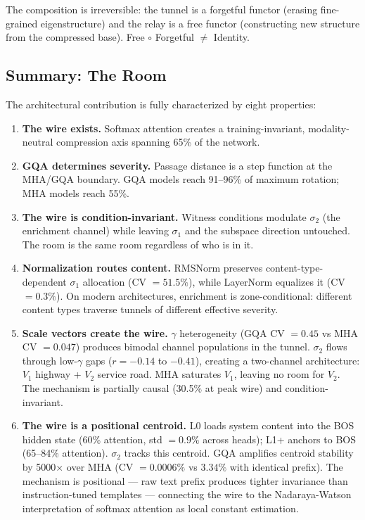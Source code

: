 \documentclass[12pt]{article}
\begin{document}
The composition is irreversible: the tunnel is a forgetful functor (erasing fine-grained eigenstructure) and the relay is a free functor (constructing new structure from the compressed base). Free $\circ$ Forgetful $\neq$ Identity.

\subsection{Summary: The Room}

The architectural contribution is fully characterized by eight properties:

\begin{enumerate}
\item \textbf{The wire exists.} Softmax attention creates a training-invariant, modality-neutral compression axis spanning 65\% of the network.
\item \textbf{GQA determines severity.} Passage distance is a step function at the MHA/GQA boundary. GQA models reach 91--96\% of maximum rotation; MHA models reach 55\%.
\item \textbf{The wire is condition-invariant.} Witness conditions modulate $\sigma_2$ (the enrichment channel) while leaving $\sigma_1$ and the subspace direction untouched. The room is the same room regardless of who is in it.
\item \textbf{Normalization routes content.} RMSNorm preserves content-type-dependent $\sigma_1$ allocation (CV $= 51.5\%$), while LayerNorm equalizes it (CV $= 0.3\%$). On modern architectures, enrichment is zone-conditional: different content types traverse tunnels of different effective severity.
\item \textbf{Scale vectors create the wire.} $\gamma$ heterogeneity (GQA CV $= 0.45$ vs MHA CV $= 0.047$) produces bimodal channel populations in the tunnel. $\sigma_2$ flows through low-$\gamma$ gaps ($r = -0.14$ to $-0.41$), creating a two-channel architecture: $V_1$ highway + $V_2$ service road. MHA saturates $V_1$, leaving no room for $V_2$. The mechanism is partially causal (30.5\% at peak wire) and condition-invariant.
\item \textbf{The wire is a positional centroid.} L0 loads system content into the BOS hidden state (60\% attention, std $= 0.9\%$ across heads); L1+ anchors to BOS (65--84\% attention). $\sigma_2$ tracks this centroid. GQA amplifies centroid stability by 5000$\times$ over MHA (CV $= 0.0006\%$ vs $3.34\%$ with identical prefix). The mechanism is positional --- raw text prefix produces tighter invariance than instruction-tuned templates --- connecting the wire to the Nadaraya-Watson interpretation of softmax attention as local constant estimation.

\end{enumerate}
\end{document}

